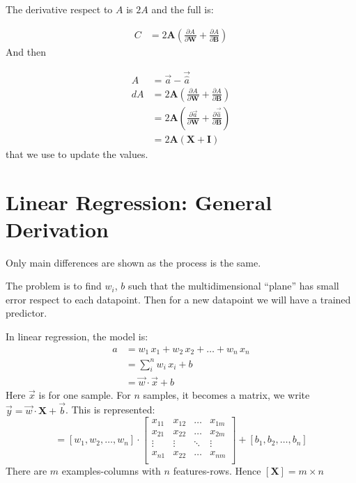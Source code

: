 The derivative respect to $A$ is $2A$ and the full is:

\begin{align*}
  C &= 2\mathbf{A}\left(\frac{\partial A}{\partial \mathbf{W}} + \frac{\partial A}{\partial \mathbf{B}}\right)
\end{align*}
And then 

\begin{align*}
  A &= \vec{a} - \vec{\hat{a}}\\
  dA&= 2\mathbf{A}\left(\frac{\partial A}{\partial \mathbf{W}} + \frac{\partial A}{\partial \mathbf{B}}\right)\\
  &= 2\mathbf{A}(\frac{\partial \vec{a}}{\partial \mathbf{W}} + \frac{\partial \vec{\hat{a}}}{\partial \mathbf{B}})\\
  &= 2\mathbf{A}(\mathbf{X} + \mathbf{I})
\end{align*}
that we use to update the values.

\section{Linear Regression: General Derivation}
Only main differences are shown as the process is the same.

The problem is to find $w_i$, $b$ such that the multidimensional ``plane'' has small error respect to each datapoint. Then for a new datapoint we will have a trained predictor.

In linear regression, the model is:
\begin{align*}
 a &= w_1\, x_1 + w_2\, x_2 +\ldots+ w_n\, x_n\\
   &= \sum_i^n w_i\, x_i + b \\
   &= \vec{w}\cdot\vec{x} + b
\end{align*}
Here $\vec{x}$ is for one sample. For $n$ samples, it becomes a matrix, we write $\vec{y} = \vec{w}\cdot\mathbf{X} + \vec{b}$. This is represented:
\begin{equation*}
  [a_1, a_2, \ldots, a_n] = 
  [w_1, w_2, \ldots, w_n] \cdot
  \begin{bmatrix}
    x_{11} & x_{12} & \ldots & x_{1m}\\
    x_{21} & x_{22} & \ldots & x_{2m}\\
    \vdots & \vdots & \ddots & \vdots\\
    x_{n1} & x_{22} & \ldots & x_{nm}\\
  \end{bmatrix}
  + [b_1, b_2, \ldots, b_n]
\end{equation*}
There are $m$ examples-columns with $n$ features-rows. Hence $[\mathbf{X}] = m\times{}n$

